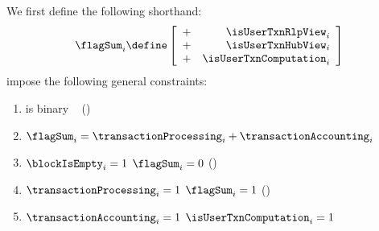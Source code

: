 We first define the following shorthand:
\[
	\flagSum _{i}
	\define
	\left[ \begin{array}{cr}
		+ & \isUserTxnRlpView     _{i} \\
		+ & \isUserTxnHubView     _{i} \\
		+ & \isUserTxnComputation _{i} \\
	\end{array} \right]
\]
impose the following general constraints:
\begin{enumerate}
	\item \flagSum{} is binary ~ (\sanityCheck)
	\item $\flagSum _{i} = \transactionProcessing _{i} + \transactionAccounting _{i}$
	\item \If $\blockIsEmpty    _{i} = 1$ \Then $\flagSum              _{i} = 0$ (\sanityCheck)
	\item \If $\transactionProcessing _{i} = 1$ \Then $\flagSum              _{i} = 1$ (\sanityCheck)
	\item \If $\transactionAccounting _{i} = 1$ \Then $\isUserTxnComputation _{i} = 1$
\end{enumerate}
